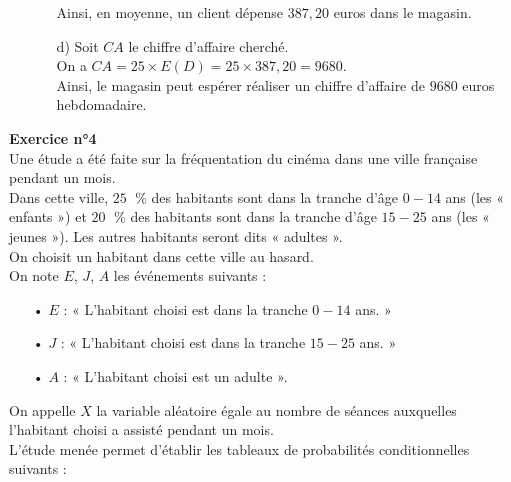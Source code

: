 \begin{itemize}
\begin{itemize}
Ainsi, en moyenne, un client dépense $387,20$ euros dans le magasin. \\

\item[d)] Soit $CA$ le chiffre d'affaire cherché. \\

On a $CA = 25 \times E\left(D\right) = 25 \times 387,20 = 9680$. \\

Ainsi, le magasin peut espérer réaliser un chiffre d'affaire de $9680$ euros hebdomadaire.
\end{itemize}
\end{itemize}

\newpage

\textbf{Exercice n°4} \\

Une étude a été faite sur la fréquentation du cinéma dans une ville française pendant un mois. \\
Dans cette ville, $25 \;$ \% des habitants sont dans la tranche d'âge $0-14$ ans (les « enfants ») et $20 \;$ \% des habitants sont dans la tranche d'âge $15-25$ ans (les « jeunes »). Les autres habitants seront dits « adultes ». \\

On choisit un habitant dans cette ville au hasard. \\

On note $E$, $J$, $A$ les événements suivants : \\

\begin{itemize}
\item[•] $E$ : « L'habitant choisi est dans la tranche $0-14$ ans. »
\item[•] $J$ : « L'habitant choisi est dans la tranche $15-25$ ans. »
\item[•] $A$ : « L'habitant choisi est un adulte ». 
\end{itemize}

\vspace*{.3cm}

On appelle $X$ la variable aléatoire égale au nombre de séances auxquelles l'habitant choisi a assisté pendant un mois. \\

L'étude menée permet d'établir les tableaux de probabilités conditionnelles suivants : \\

